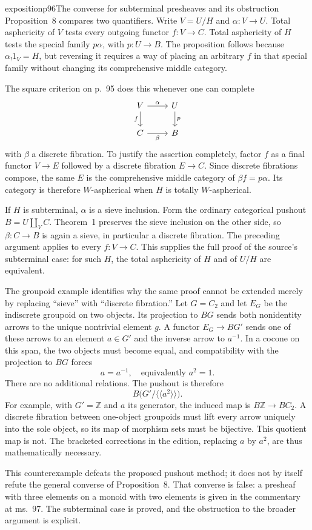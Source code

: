 \begin{dcomment}{exposition}{p96}{The converse for subterminal presheaves and its obstruction}
Proposition~8 compares two quantifiers. Write $V=U/H$ and $\alpha:V\to U$. Total asphericity of $V$ tests every outgoing functor $f:V\to C$. Total asphericity of $H$ tests the special family $p\alpha$, with $p:U\to B$. The proposition follows because $\alpha_!1_V=H$, but reversing it requires a way of placing an arbitrary $f$ in that special family without changing its comprehensive middle category.

The square criterion on p.~95 does this whenever one can complete
\[
\begin{tikzcd}
V\arrow[r,"\alpha"]\arrow[d,"f"']&U\arrow[d,"p"]\\
C\arrow[r,"\beta"']&B
\end{tikzcd}
\]
with $\beta$ a discrete fibration. To justify the assertion completely, factor $f$ as a final functor $V\to E$ followed by a discrete fibration $E\to C$. Since discrete fibrations compose, the same $E$ is the comprehensive middle category of $\beta f=p\alpha$. Its category is therefore $W$-aspherical when $H$ is totally $W$-aspherical.

If $H$ is subterminal, $\alpha$ is a sieve inclusion. Form the ordinary categorical pushout $B=U\amalg_V C$. Theorem~1 preserves the sieve inclusion on the other side, so $\beta:C\to B$ is again a sieve, in particular a discrete fibration. The preceding argument applies to every $f:V\to C$. This supplies the full proof of the source's subterminal case: for such $H$, the total asphericity of $H$ and of $U/H$ are equivalent.

The groupoid example identifies why the same proof cannot be extended merely by replacing ``sieve'' with ``discrete fibration.'' Let $G=C_2$ and let $E_G$ be the indiscrete groupoid on two objects. Its projection to $BG$ sends both nonidentity arrows to the unique nontrivial element $g$. A functor $E_G\to BG'$ sends one of these arrows to an element $a\in G'$ and the inverse arrow to $a^{-1}$. In a cocone on this span, the two objects must become equal, and compatibility with the projection to $BG$ forces
\[
a=a^{-1},\quad\text{equivalently }a^2=1.
\]
There are no additional relations. The pushout is therefore
\[
B\bigl(G'/\langle\!\langle a^2\rangle\!\rangle\bigr).
\]
For example, with $G'=\mathbb Z$ and $a$ its generator, the induced map is $B\mathbb Z\to BC_2$. A discrete fibration between one-object groupoids must lift every arrow uniquely into the sole object, so its map of morphism sets must be bijective. This quotient map is not. The bracketed corrections in the edition, replacing $a$ by $a^2$, are thus mathematically necessary.

This counterexample defeats the proposed pushout method; it does not by itself refute the general converse of Proposition~8. That converse is false: a presheaf with three elements on a monoid with two elements is given in the commentary at ms.~97. The subterminal case is proved, and the obstruction to the broader argument is explicit.
\end{dcomment}

